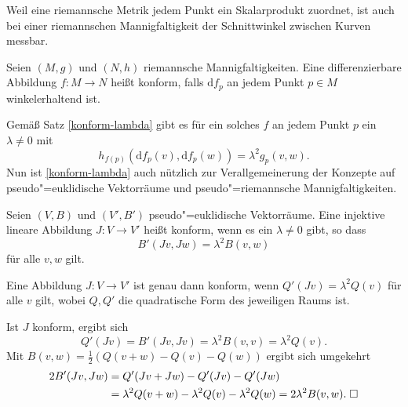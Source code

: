 Weil eine riemannsche Metrik jedem Punkt ein Skalarprodukt zuordnet,
ist auch bei einer riemannschen Mannigfaltigkeit der Schnittwinkel
zwischen Kurven messbar.
\begin{definition}
Seien $(M,g)$ und $(N,h)$ riemannsche Mannigfaltigkeiten. Eine
differenzierbare Abbildung $f\colon M\to N$ heißt konform,
falls $\mathrm df_p$ an jedem Punkt $p\in M$ winkelerhaltend ist.
\end{definition}
Gemäß Satz \ref{konform-lambda} gibt es für ein solches $f$ 
an jedem Punkt $p$ ein $\lambda\ne 0$ mit
\begin{equation}
h_{f(p)}(\mathrm df_p(v),\mathrm df_p(w)) = \lambda^2 g_p(v,w).
\end{equation}
Nun ist \ref{konform-lambda} auch nützlich zur Verallgemeinerung
der Konzepte auf pseudo"=euklidische Vektorräume
und pseudo"=riemannsche Mannigfaltigkeiten.
\begin{definition}
Seien $(V,B)$ und $(V',B')$ pseudo"=euklidische Vektorräume.
Eine injektive lineare Abbildung $J: V\to V'$ heißt konform, wenn
es ein $\lambda\ne 0$ gibt, so dass%
\begin{equation}
B'(Jv,Jw) = \lambda^2 B(v,w)
\end{equation}
für alle $v,w$ gilt.
\end{definition}
\begin{corollary}
Eine Abbildung $J\colon V\to V'$ ist genau dann konform, wenn
$Q'(Jv)=\lambda^2 Q(v)$ für alle $v$ gilt, wobei $Q,Q'$
die quadratische Form des jeweiligen Raums ist.
\end{corollary}
 Ist $J$ konform, ergibt sich
\begin{equation}
Q'(Jv) = B'(Jv,Jv) = \lambda^2 B(v,v) = \lambda^2 Q(v).
\end{equation}
Mit $B(v,w) = \frac{1}{2}(Q(v+w)-Q(v)-Q(w))$ ergibt sich umgekehrt
\begin{align}
2B'(Jv,Jw) &= Q'(Jv+Jw)-Q'(Jv)-Q'(Jw)\\
&= \lambda^2 Q(v+w) - \lambda^2 Q(v) - \lambda^2 Q(w)
= 2\lambda^2 B(v,w).\;\Box
\end{align}

